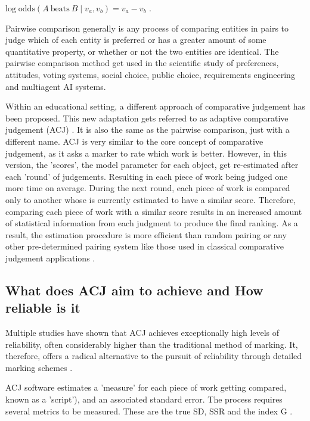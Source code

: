 		\begin{center}
			 
		$\displaystyle \mathrm {log\;odds} (A\ {\text{beats}}\ B\mid v_{a},v_{b})=v_{a}-v_{b}$ .
		
		\end{center}
	
		Pairwise comparison generally is any process of comparing entities in pairs to judge which of each entity is preferred or has a greater amount of some quantitative property, or whether or not the two entities are identical. The pairwise comparison method get used in the scientific study of preferences, attitudes, voting systems, social choice, public choice, requirements engineering and multiagent AI systems.
		
		Within an educational setting, a different approach of comparative judgement has been proposed. This new adaptation gets referred to as adaptive comparative judgement (ACJ) \cite{pollitt2012method}. It is also the same as the pairwise comparison, just with a different name. ACJ is very similar to the core concept of comparative judgement, as it asks a marker to rate which work is better.  However, in this version, the 'scores', the model parameter for each object, get re-estimated after each 'round' of judgements. Resulting in each piece of work being judged one more time on average. During the next round, each piece of work is compared only to another whose is currently estimated to have a similar score. Therefore, comparing each piece of work with a similar score results in an increased amount of statistical information from each judgment to produce the final ranking. As a result, the estimation procedure is more efficient than random pairing or any other pre-determined pairing system like those used in classical comparative judgement applications \cite{pollitt2012method}.
		
		\subsection{What does ACJ aim to achieve and How reliable is it}
		
		Multiple studies have shown that ACJ achieves exceptionally high levels of reliability, often considerably higher than the traditional method of marking. It, therefore, offers a radical alternative to the pursuit of reliability through detailed marking schemes \cite{pollitt2012method}. 
		
		ACJ software estimates a 'measure' for each piece of work getting compared, known as a 'script'), and an associated standard error. The process requires several metrics to be measured. These are the true SD, SSR and the index G \cite{ bramley2015investigating}.
		

